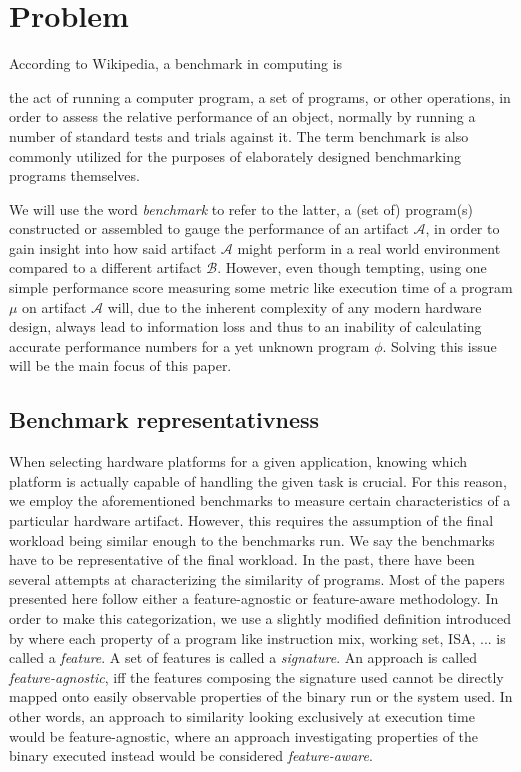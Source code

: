 \documentclass[../bachelor_paper.tex]{subfiles}
\begin{document}
\chapter{Problem}
	\label{ch:prob}

According to Wikipedia, a benchmark in computing is
\begin{displayquote}
the act of running a computer program, a set of programs, or other operations, in order to assess the relative performance of an object, normally by running a number of standard tests and trials against it. The term benchmark is also commonly utilized for the purposes of elaborately designed benchmarking programs themselves. \cite{BenchmarkComputing2021}
\end{displayquote}
We will use the word \emph{benchmark} to refer to the latter, a (set of) program(s) constructed or assembled to gauge the performance of an artifact $\mathcal{A}$, in order to gain insight into how said artifact $\mathcal{A}$ might perform in a real world environment compared to a different artifact $\mathcal{B}$. However, even though tempting, using one simple performance score measuring some metric like execution time of a program $\mu$ on artifact $\mathcal{A}$ will, due to the inherent complexity of any modern hardware design, always lead to information loss and thus to an inability of calculating accurate performance numbers for a yet unknown program $\phi$. Solving this issue will be the main focus of this paper. 

\section{Benchmark representativness}
	\label{sec:prob/repr}
When selecting hardware platforms for a given application, knowing which platform is actually capable of handling the given task is crucial. For this reason, we employ the aforementioned benchmarks to measure certain characteristics of a particular hardware artifact. However, this requires the assumption of the final workload being similar enough to the benchmarks run. We say the benchmarks have to be representative of the final workload. In the past, there have been several attempts at characterizing the similarity of programs. Most of the papers presented here follow either a feature-agnostic or feature-aware methodology. In order to make this categorization, we use a slightly modified definition introduced by \cite{cammarotaOptimizingProgramPerformance2013} where each property of a program like instruction mix, working set, \ac{ISA}, ... is called a \emph{feature}. A set of features is called a \emph{signature}. An approach is called \emph{feature-agnostic}, iff the features composing the signature used cannot be directly mapped onto easily observable properties of the binary run or the system used. In other words, an approach to similarity looking exclusively at execution time would be feature-agnostic, where an approach investigating properties of the binary executed instead would be considered \emph{feature-aware}.
\end{document}
